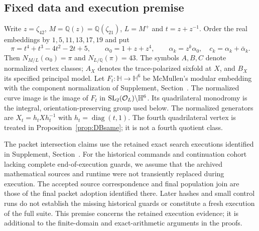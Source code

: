 \subsection{Fixed data and execution premise}
Write $z=\zeta_{42}$, $M=\mathbb Q(z)=\mathbb Q(\zeta_{21})$,
$L=M^+$ and $t=z+z^{-1}$. Order the real embeddings by
$1,5,11,13,17,19$ and put
\[
 \pi=t^4+t^3-4t^2-2t+5,\qquad \alpha_0=1+z+z^4,
 \qquad \alpha_k=z^k\alpha_0,\quad c_k=\alpha_k+\bar\alpha_k.
\]
Then $N_{M/L}(\alpha_0)=\pi$ and $N_{L/\mathbb Q}(\pi)=43$.
The symbols $A,B,C$ denote normalized vertex classes; $A_X$ denotes the
trace-polarized sixfold at $X$, and $B_X$ its specified principal model.
Let $F_t:\mathbb H\to\mathbb H^6$ be McMullen's modular embedding
with the component normalization of Supplement, Section~.
The normalized curve image is the image of $F_t$ in
$\operatorname{SL}_2(\mathcal O_L)\backslash\mathbb H^6$. Its quadrilateral
monodromy is the integral, orientation-preserving group used below.
The normalized generators are $X_t=h_tXh_t^{-1}$ with
$h_t=\operatorname{diag}(t,1)$. The fourth quadrilateral vertex is treated
in Proposition~\ref{prop:DBsame}; it is not a fourth quotient class.

\begin{executionhypothesis}\label{hyp:packetexecution}
The packet intersection claims use the retained exact search executions
identified in Supplement, Section~. For the historical commands and
continuation cohort lacking complete end-of-execution guards, we assume
that the archived mathematical sources and runtime were not transiently
replaced during execution. The accepted source correspondence and final
population join are those of the final packet adoption identified there.
Later hashes and small control runs do not establish the missing historical
guards or constitute a fresh execution of the full suite.
This premise concerns the retained execution evidence; it is additional
to the finite-domain and exact-arithmetic arguments in the proofs.
\end{executionhypothesis}

